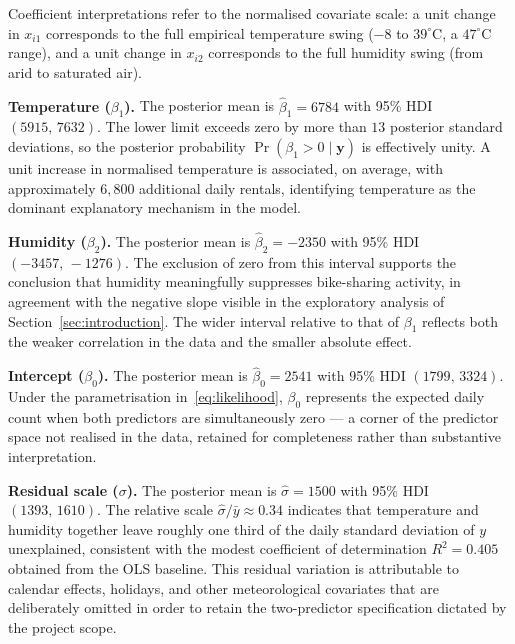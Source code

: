 Coefficient interpretations refer to the normalised covariate scale: a unit change in $x_{i1}$ corresponds to the full empirical temperature swing ($-8$ to $39^{\circ}\text{C}$, a $47^{\circ}\text{C}$ range), and a unit change in $x_{i2}$ corresponds to the full humidity swing (from arid to saturated air).

\textbf{Temperature ($\beta_1$).} The posterior mean is $\hat{\beta}_1=6784$ with 95\% HDI $(5915,\,7632)$. The lower limit exceeds zero by more than $13$ posterior standard deviations, so the posterior probability $\Pr(\beta_1>0\mid\mathbf{y})$ is effectively unity. A unit increase in normalised temperature is associated, on average, with approximately $6{,}800$ additional daily rentals, identifying temperature as the dominant explanatory mechanism in the model.

\textbf{Humidity ($\beta_2$).} The posterior mean is $\hat{\beta}_2=-2350$ with 95\% HDI $(-3457,\,-1276)$. The exclusion of zero from this interval supports the conclusion that humidity meaningfully suppresses bike-sharing activity, in agreement with the negative slope visible in the exploratory analysis of Section~\ref{sec:introduction}. The wider interval relative to that of $\beta_1$ reflects both the weaker correlation in the data and the smaller absolute effect.

\textbf{Intercept ($\beta_0$).} The posterior mean is $\hat{\beta}_0=2541$ with 95\% HDI $(1799,\,3324)$. Under the parametrisation in~\eqref{eq:likelihood}, $\beta_0$ represents the expected daily count when both predictors are simultaneously zero — a corner of the predictor space not realised in the data, retained for completeness rather than substantive interpretation.

\textbf{Residual scale ($\sigma$).} The posterior mean is $\hat{\sigma}=1500$ with 95\% HDI $(1393,\,1610)$. The relative scale $\hat{\sigma}/\bar{y}\approx 0.34$ indicates that temperature and humidity together leave roughly one third of the daily standard deviation of $y$ unexplained, consistent with the modest coefficient of determination $R^{2}=0.405$ obtained from the OLS baseline. This residual variation is attributable to calendar effects, holidays, and other meteorological covariates that are deliberately omitted in order to retain the two-predictor specification dictated by the project scope.
